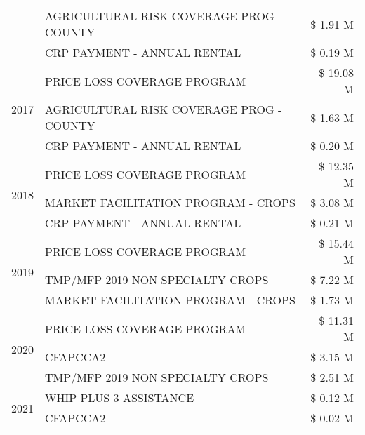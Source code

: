 \begin{tabular}{llr}
 & AGRICULTURAL RISK COVERAGE PROG - COUNTY      & \$ 1.91 M \\
 & CRP PAYMENT - ANNUAL RENTAL                   & \$ 0.19 M \\
\cline{1-3}
\multirow[t]{3}{*}{2017} & PRICE LOSS COVERAGE PROGRAM & \$ 19.08 M \\
 & AGRICULTURAL RISK COVERAGE PROG - COUNTY & \$ 1.63 M \\
 & CRP PAYMENT - ANNUAL RENTAL & \$ 0.20 M \\
\cline{1-3}
\multirow[t]{3}{*}{2018} & PRICE LOSS COVERAGE PROGRAM & \$ 12.35 M \\
 & MARKET FACILITATION PROGRAM - CROPS & \$ 3.08 M \\
 & CRP PAYMENT - ANNUAL RENTAL & \$ 0.21 M \\
\cline{1-3}
\multirow[t]{3}{*}{2019} & PRICE LOSS COVERAGE PROGRAM & \$ 15.44 M \\
 & TMP/MFP 2019 NON SPECIALTY CROPS & \$ 7.22 M \\
 & MARKET FACILITATION PROGRAM - CROPS & \$ 1.73 M \\
\cline{1-3}
\multirow[t]{3}{*}{2020} & PRICE LOSS COVERAGE PROGRAM & \$ 11.31 M \\
 & CFAPCCA2 & \$ 3.15 M \\
 & TMP/MFP 2019 NON SPECIALTY CROPS & \$ 2.51 M \\
\cline{1-3}
\multirow[t]{2}{*}{2021} & WHIP PLUS 3 ASSISTANCE & \$ 0.12 M \\
 & CFAPCCA2 & \$ 0.02 M \\
\cline{1-3}
\bottomrule
\end{tabular}
